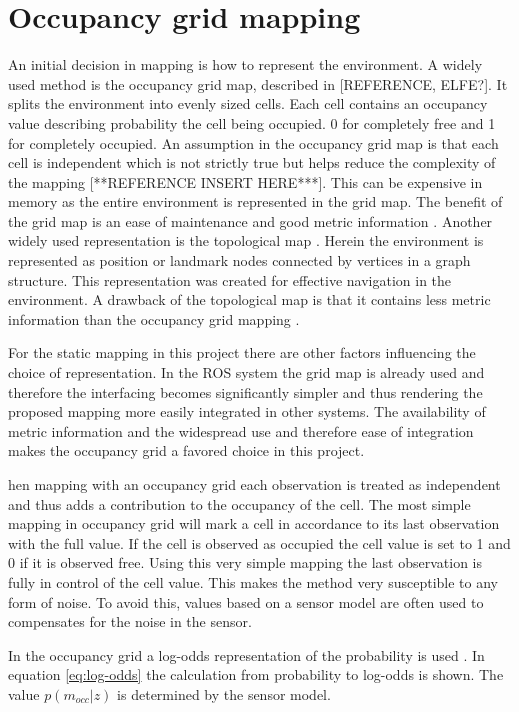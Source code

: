 \section{Occupancy grid mapping}

An initial decision in mapping is how to represent the environment. A widely used method is the occupancy grid map, described in [REFERENCE, ELFE?]. It splits the environment into evenly sized cells. Each cell contains an occupancy value describing probability the cell being occupied. 0 for completely free and 1 for completely occupied. An assumption in the occupancy grid map is that each cell is independent which is not strictly true but helps reduce the complexity of the mapping [**REFERENCE INSERT HERE***]. This can be expensive in memory as the entire environment is represented in the grid map. The benefit of the grid map is an ease of maintenance and good metric information \cite{mapbuildingSummary}. 
Another widely used representation is the topological map \cite{topologyOrig}. 
Herein the environment is represented as position or landmark nodes connected by vertices in a graph structure. 
This representation was created for effective navigation in the environment. 
A drawback of the topological map is that it contains less metric information than the occupancy grid mapping \cite{mapbuildingSummary}.

For the static mapping in this project there are other factors influencing the choice of representation. In the ROS system the grid map is already used and therefore the interfacing becomes significantly simpler and thus rendering the proposed mapping more easily integrated in other systems. The availability of metric information and the widespread use and therefore ease of integration makes the occupancy grid a favored choice in this project. 

hen mapping with an occupancy grid each observation is treated as independent and thus adds a contribution to the occupancy of the cell. The most simple mapping in occupancy grid will mark a cell in accordance to its last observation with the full value. If the cell is observed as occupied the cell value is set to 1 and 0 if it is observed free. Using this very simple mapping the last observation is fully in control of the cell value. This makes the method very susceptible to any form of noise. To avoid this, values based on a sensor model are often used to compensates for the noise in the sensor. 

In the occupancy grid a log-odds representation of the probability is used \cite{probRob}. In equation \ref{eq:log-odds} the calculation from probability to log-odds is shown. The value \(p(m_{occ}|z)\) is determined by the sensor model. 

